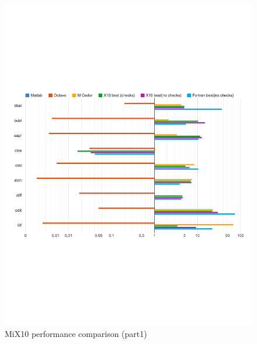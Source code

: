 \begin{figure}[htbp] \begin{center}
\includegraphics[width=\linewidth]{Figures/final/graph_1_1_1.pdf} \caption
{MiX10 performance comparison (part1) }\label{Fig:graph1_1_1} \end{center}
\end{figure} 
     
